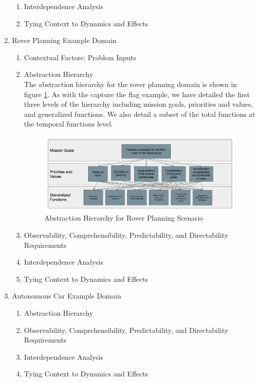 \documentclass[letterpaper, 10 pt, conference]{ieeeconf}  %
\theoremstyle{definition}
\begin{document}
\begin{enumerate}
\begin{enumerate}
    \item Interdependence Analysis
    \item Tying Context to Dynamics and Effects
\end{enumerate}


\item Rover Planning Example Domain

\begin{enumerate}
    \item Contextual Factors: Problem Inputs
    \item Abstraction Hierarchy
    \\The abstraction hierarchy for the rover planning domain is shown in figure \ref{fig:rpah}. As with the capture the flag example, we have detailed the first three levels of the hierarchy including mission goals, priorities and values, and generalized functions. We also detail a subset of the total functions at the temporal functions level. %
    
       \begin{figure}[tb]
    \centering
    \includegraphics[width=\columnwidth]{rpAH.png}
   \caption{Abstraction Hierarchy for Rover Planning Scenario}
    \label{fig:rpah}
    \end{figure}
    
    \item Observability, Comprehensibility, Predictability, and Directability Requirements
    \item Interdependence Analysis
    \item Tying Context to Dynamics and Effects
\end{enumerate}

\item Autonomous Car Example Domain

\begin{enumerate}
    \item Abstraction Hierarchy
    \item Observability, Comprehensibility, Predictability, and Directability Requirements
    \item Interdependence Analysis
    \item Tying Context to Dynamics and Effects
\end{enumerate}

\end{enumerate}
\end{document}
